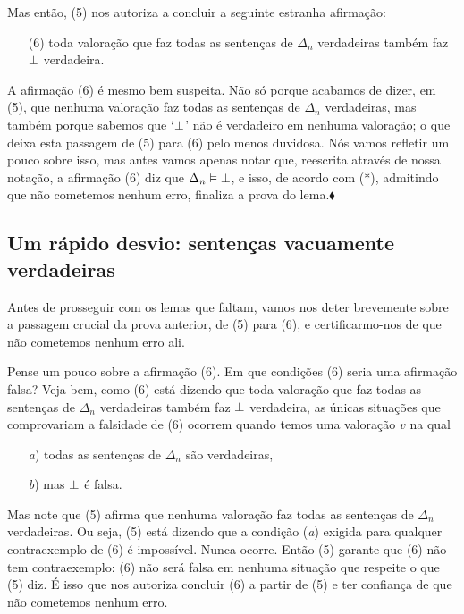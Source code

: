Mas então, (5) nos autoriza a concluir a seguinte estranha afirmação:
\begin{itemize}
	\item[(6)]  toda valoração que faz todas as sentenças de $\Delta_n$ verdadeiras também faz $\bot$ verdadeira.
\end{itemize}
A afirmação (6) é mesmo bem suspeita.
Não só porque acabamos de dizer, em (5), que nenhuma valoração faz todas as sentenças de $\Delta_n$ verdadeiras, mas também porque sabemos que  `$\bot$' não é verdadeiro em nenhuma valoração; o que deixa esta passagem de (5) para (6) pelo menos duvidosa.
Nós vamos refletir um pouco sobre isso, mas antes vamos apenas notar que, reescrita através de nossa notação, a afirmação (6) diz que $\Delta_n \vDash \bot$, e isso, de acordo com (*), admitindo que não cometemos nenhum erro, finaliza a prova do lema.$\blacklozenge$


\subsection{Um rápido desvio: sentenças vacuamente verdadeiras}

Antes de prosseguir com os lemas que faltam, vamos nos deter brevemente sobre a passagem crucial da prova anterior, de (5) para (6), e certificarmo-nos de que não cometemos nenhum erro ali. 

Pense um pouco sobre a afirmação (6).
Em que condições (6) seria uma afirmação falsa?
Veja bem, como (6) está dizendo que toda valoração que faz todas as sentenças de $\Delta_n$ verdadeiras também faz $\bot$ verdadeira, as únicas situações que comprovariam a falsidade de (6) ocorrem quando temos uma valoração $v$ na qual
\begin{itemize}
	\item[\textit{a})] todas as sentenças de $\Delta_n$ são verdadeiras, 
	\item[\textit{b})] mas $\bot$ é falsa.
\end{itemize}
Mas note que (5) afirma que nenhuma valoração faz todas as sentenças de $\Delta_n$ verdadeiras.
Ou seja, (5) está dizendo que a condição (\textit{a}) exigida para qualquer contraexemplo de (6) é impossível. Nunca ocorre.
Então (5) garante que (6) não tem contraexemplo:
(6) não será falsa em nenhuma situação que respeite o que (5) diz.
É isso que nos autoriza concluir (6) a partir de (5) e ter confiança de que não cometemos nenhum erro.

